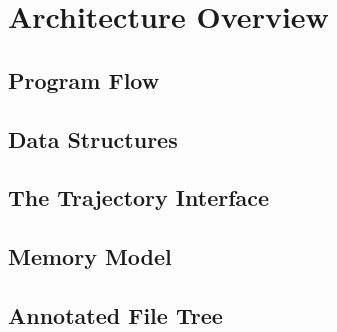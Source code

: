 \newpage
\section{Architecture Overview}

\subsection{Program Flow}

\subsection{Data Structures}

\subsection{The Trajectory Interface}

\subsection{Memory Model}

\subsection{Annotated File Tree}
